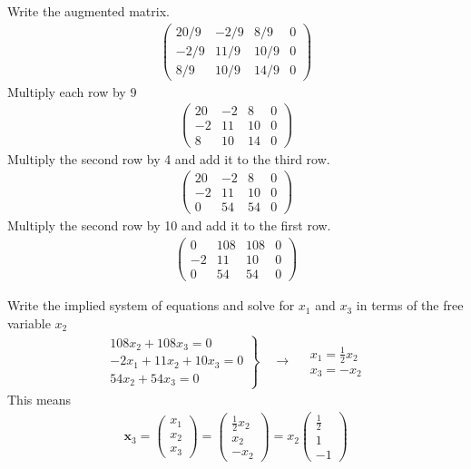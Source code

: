 \documentclass[12pt]{article}
\begin{document}
Write the augmented matrix.
\begin{align*}
\left(\begin{array}{rrr|r}
20 / 9 & -2 / 9 & 8 / 9 & 0 \\
-2 / 9 & 11 / 9 & 10 / 9 & 0 \\
8 / 9 & 10 / 9 & 14 / 9 & 0
\end{array}\right)
\end{align*}
Multiply each row by \(9\)
\begin{align*}
\left(\begin{array}{rrr|r}
20 & -2 & 8 & 0 \\
-2 & 11 & 10 & 0 \\
8 & 10 & 14 & 0
\end{array}\right)
\end{align*}
Multiply the second row by 4 and add it to the third row.
\begin{align*}
\left(\begin{array}{rrr|r}
20 & -2 & 8 & 0 \\
-2 & 11 & 10 & 0 \\
0 & 54 & 54 & 0
\end{array}\right)
\end{align*}
Multiply the second row by 10 and add it to the first row.
\begin{align*}
\left(\begin{array}{rrr|r}
0 & 108 & 108 & 0 \\
-2 & 11 & 10 & 0 \\
0 & 54 & 54 & 0
\end{array}\right)
\end{align*}

Write the implied system of equations and solve for \(x_{1}\) and \(x_{3}\) in terms
of the free variable \(x_{2}\) 
\begin{align*}
\left.\begin{array}{r}
108 x_{2}+108 x_{3}=0 \\
-2 x_{1}+11 x_{2}+10 x_{3}=0 \\
54 x_{2}+54 x_{3}=0
\end{array}\right\} \quad \rightarrow \quad \begin{array}{l}
x_{1}=\frac{1}{2} x_{2} \\
x_{3}=-x_{2}
\end{array}
\end{align*}
This means
\begin{align*}
\mathbf{x}_{3}=\left(\begin{array}{l}
x_{1} \\
x_{2} \\
x_{3}
\end{array}\right)=\left(\begin{array}{c}
\frac{1}{2} x_{2} \\
x_{2} \\
-x_{2}
\end{array}\right)=x_{2}\left(\begin{array}{c}
\frac{1}{2} \\
1 \\
-1
\end{array}\right)
\end{align*}
\end{document}
